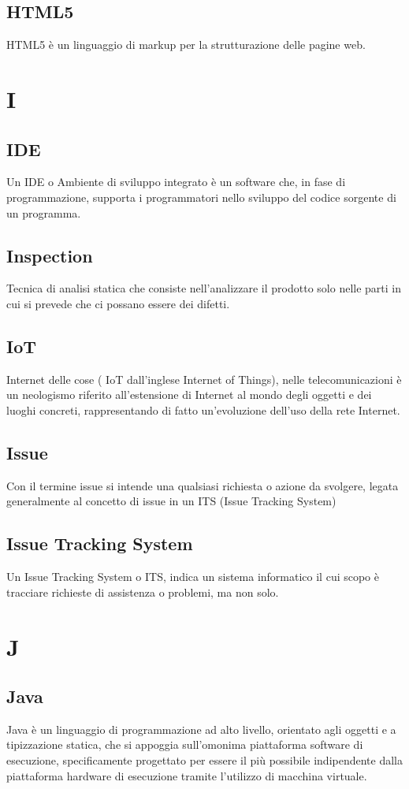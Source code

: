 \subsection{HTML5}  HTML5 è un linguaggio di markup per la strutturazione delle pagine web.

\newpage \section{I}
\subsection{IDE}   Un IDE o Ambiente di sviluppo integrato è un software che, in fase di programmazione, supporta i programmatori nello sviluppo del codice sorgente di un programma.
\subsection{Inspection}  Tecnica di analisi statica che consiste nell'analizzare il prodotto solo nelle parti in cui si prevede che ci possano essere dei difetti.
\subsection{IoT }  Internet delle cose ( IoT dall'inglese Internet of Things), nelle telecomunicazioni è un neologismo riferito all'estensione di Internet al mondo degli oggetti e dei luoghi concreti, rappresentando di fatto un'evoluzione dell'uso della rete Internet.
\subsection{Issue}  Con il termine issue si intende una qualsiasi richiesta o azione da svolgere, legata generalmente al concetto di issue in un ITS (Issue Tracking System)
\subsection{Issue Tracking System}  Un Issue Tracking System o ITS, indica un sistema informatico il cui scopo è tracciare richieste di assistenza o problemi, ma non solo.


\newpage \section{J}
\subsection{Java}  Java è un linguaggio di programmazione ad alto livello, orientato agli oggetti e a tipizzazione statica, che si appoggia sull'omonima piattaforma software di esecuzione, specificamente progettato per essere il più possibile indipendente dalla piattaforma hardware di esecuzione tramite l'utilizzo di macchina virtuale.
